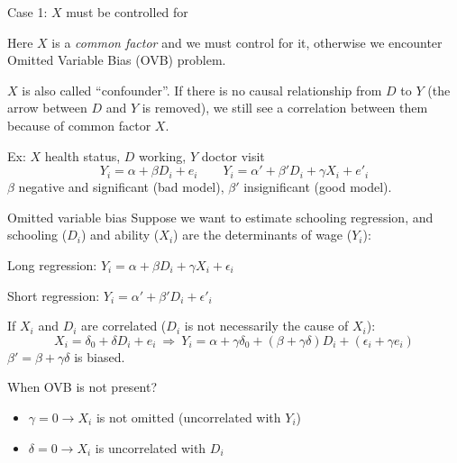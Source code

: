 \documentclass[handout]{beamer}
\begin{document}
\begin{frame}{Case 1: $X$ must be controlled for}
\begin{center}
\end{center}
Here $X$ is a \textit{common factor} and we must control for it, otherwise we encounter Omitted Variable Bias (OVB) problem.\medskip

$X$ is also called ``confounder''. If there is no causal relationship from $D$ to $Y$ (the arrow between $D$ and $Y$ is removed), we still see a correlation between them because of common factor $X$.\bigskip

Ex: $X$ health status, $D$ working, $Y$ doctor visit
\[Y_i=\alpha+\beta D_i+e_i \qquad Y_i=\alpha'+\beta' D_i+\gamma X_i+e'_i  \]
$\beta$ negative and significant (bad model), $\beta'$ insignificant (good model).

\end{frame}

\begin{frame}{Omitted variable bias}
Suppose we want to estimate schooling regression, and schooling ($D_i$) and ability ($X_i$) are the determinants of wage ($Y_i$):\medskip

Long regression: $Y_i=\alpha+\beta D_i+\gamma X_i +\epsilon_i$\medskip

Short regression: $Y_i=\alpha'+\beta' D_i+\epsilon'_i$\bigskip

If $X_i$ and $D_i$ are correlated ($D_i$ is not necessarily the cause of $X_i$): 
\[X_i=\delta_0+\delta D_i + e_i \ \Rightarrow \ Y_i=\alpha+\gamma\delta_0+(\beta+\gamma\delta)D_i+(\epsilon_i+\gamma e_i) \]
$\beta'=\beta+\gamma\delta$ is biased. 
\medskip

When OVB is not present?\pause
\begin{itemize}
\item $\gamma=0 \rightarrow X_i$ is not omitted (uncorrelated with $Y_i$)
\item $\delta=0 \rightarrow X_i$ is uncorrelated with $D_i$
\end{itemize}

\end{frame}
\end{document}
